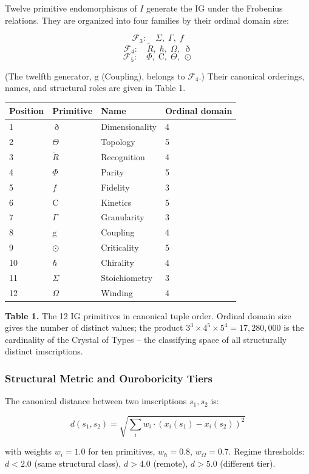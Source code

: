 Twelve primitive endomorphisms of \(I\) generate the IG under the
Frobenius relations. They are organized into four families by their
ordinal domain size:

\[\mathcal{F}_3: \quad \Sigma, \; \Gamma, \; \mathit{f}\]
\[\mathcal{F}_4: \quad \check{R}, \; \hbar, \; \Omega, \; \eth\]
\[\mathcal{F}_5: \quad \Phi, \; \mathrm{C}, \; \Theta, \; \odot\]

(The twelfth generator, \(\mathrm{g}\) (Coupling), belongs to
\(\mathcal{F}_4\).) Their canonical orderings, names, and structural
roles are given in Table 1.

\begin{longtable}[]{@{}llll@{}}
\toprule
Position & Primitive & Name & Ordinal domain\tabularnewline
\midrule
\endhead
1 & \(\eth\) & Dimensionality & 4\tabularnewline
2 & \(\Theta\) & Topology & 5\tabularnewline
3 & \(\check{R}\) & Recognition & 4\tabularnewline
4 & \(\Phi\) & Parity & 5\tabularnewline
5 & \(f\) & Fidelity & 3\tabularnewline
6 & \(\mathrm{C}\) & Kinetics & 5\tabularnewline
7 & \(\Gamma\) & Granularity & 3\tabularnewline
8 & \(\mathrm{g}\) & Coupling & 4\tabularnewline
9 & \(\odot\) & Criticality & 5\tabularnewline
10 & \(\hbar\) & Chirality & 4\tabularnewline
11 & \(\Sigma\) & Stoichiometry & 3\tabularnewline
12 & \(\Omega\) & Winding & 4\tabularnewline
\bottomrule
\end{longtable}

\textbf{Table 1.} The 12 IG primitives in canonical tuple order. Ordinal
domain size gives the number of distinct values; the product
\(3^3 \times 4^5 \times 5^4 = 17{,}280{,}000\) is the cardinality of the
Crystal of Types -- the classifying space of all structurally distinct
imscriptions.

\hypertarget{structural-metric-and-ouroboricity-tiers}{%
\subsubsection{Structural Metric and Ouroboricity
Tiers}\label{structural-metric-and-ouroboricity-tiers}}

The canonical distance between two imscriptions \(s_1, s_2\) is:

\[d(s_1, s_2) = \sqrt{\sum_i w_i \cdot (x_i(s_1) - x_i(s_2))^2}\]

with weights \(w_i = 1.0\) for ten primitives, \(w_\hbar = 0.8\),
\(w_\Omega = 0.7\). Regime thresholds: \(d < 2.0\) (same structural
class), \(d > 4.0\) (remote), \(d > 5.0\) (different tier).

